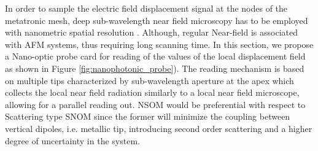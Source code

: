 \par In order to sample the electric field displacement signal at the nodes of the metatronic mesh, deep sub-wavelength near field microscopy has to be employed with nanometric spatial resolution \cite{bao_mapping_2012,bao_visualizing_2015,caselli_deep-subwavelength_2015}. Although, regular Near-field is associated with AFM systems, thus requiring long scanning time. In this section, we propose a Nano-optic probe card for reading of the values of the local displacement field as shown in Figure \ref{fig:nanophotonic_probe}). The reading mechanism is based on multiple tips characterized by sub-wavelength aperture at the apex which collects the local near field radiation similarly to a local near field microscope, allowing for a parallel reading out. NSOM would be preferential with respect to Scattering type SNOM since the former will minimize the coupling between vertical dipoles, i.e. metallic tip, introducing second order scattering and a higher degree of uncertainty in the system.


